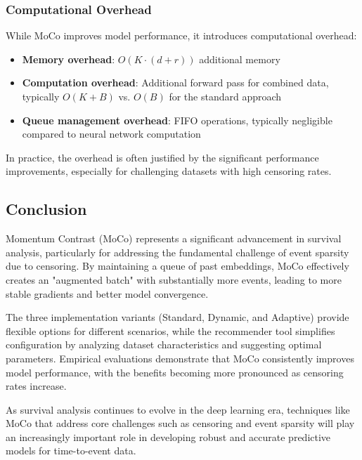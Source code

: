 \subsubsection{Computational Overhead}

While MoCo improves model performance, it introduces computational overhead:

\begin{itemize}
\item \textbf{Memory overhead}: $O(K \cdot (d + r))$ additional memory
\item \textbf{Computation overhead}: Additional forward pass for combined data, typically $O(K + B)$ vs. $O(B)$ for the standard approach
\item \textbf{Queue management overhead}: FIFO operations, typically negligible compared to neural network computation
\end{itemize}

In practice, the overhead is often justified by the significant performance improvements, especially for challenging datasets with high censoring rates.

\subsection{Conclusion}

Momentum Contrast (MoCo) represents a significant advancement in survival analysis, particularly for addressing the fundamental challenge of event sparsity due to censoring. By maintaining a queue of past embeddings, MoCo effectively creates an "augmented batch" with substantially more events, leading to more stable gradients and better model convergence.

The three implementation variants (Standard, Dynamic, and Adaptive) provide flexible options for different scenarios, while the recommender tool simplifies configuration by analyzing dataset characteristics and suggesting optimal parameters. Empirical evaluations demonstrate that MoCo consistently improves model performance, with the benefits becoming more pronounced as censoring rates increase.

As survival analysis continues to evolve in the deep learning era, techniques like MoCo that address core challenges such as censoring and event sparsity will play an increasingly important role in developing robust and accurate predictive models for time-to-event data.
